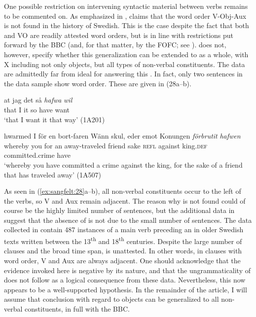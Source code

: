 \documentclass[output=paper, colorlinks, citecolor=brown]{langscibook}
\begin{document}
One possible restriction on intervening syntactic material between verbs remains to be commented on. As emphasized in , \citet[155, 159]{Petzell2011}  claims that the word order V-Obj-Aux is not found in the history of Swedish. This is the case despite the fact that both  and VO are readily attested word orders, but is in line with restrictions put forward by the BBC (and, for that matter, by the FOFC; see ). \citet{Petzell2011} does not, however, specify whether this generalization can be extended to  as a whole, with X including not only objects, but all types of non-verbal constituents. The  data are admittedly far from ideal for answering this . In fact, only two sentences in the data sample show  word order. These are given in (28a–b).


\ea\label{ex:sangfelt:28}
\ea\label{ex:sangfelt:28a}
\gll at jag det så \textit{hafwa} \textit{wil} \\ %
 that I it so have want\\
\glt ‘that I want it that way’ (1A201)

\ex\label{ex:sangfelt:28b}
\gll hwarmed I {för} {en} {bort-faren} {Wänn} {skul,} {eder} {emot} {Konungen} \textit{förbrutit} \textit{hafwen}\\
 whereby you for an away-traveled friend sake \textsc{refl} against king.\textsc{def} committed.crime have\\
\glt ‘whereby you have committed a crime against the king, for the sake of a friend that has traveled away’ (1A507)
\z 
\z 


As seen in (\ref{ex:sangfelt:28}a–b), all non-verbal constituents occur to the left of the verbs, so V and Aux remain adjacent. The reason why  is not found could of course be the highly limited number of sentences, but the additional data in \citet{Sangfelt2019} suggest that the absence of  is not due to the small number of sentences. The data collected in \citet[133]{Sangfelt2019} contain 487 instances of a main verb preceding an  in older Swedish texts written between the 13\textsuperscript{th} and 18\textsuperscript{th} centuries. Despite the large number of clauses and the broad time span,  is unattested. In other words, in clauses with  word order, V and Aux are always adjacent. One should acknowledge that the evidence invoked here is negative by its nature, and that the ungrammaticality of  does not follow as a logical consequence from these data. Nevertheless, this now appears to be a well-supported hypothesis. In the remainder of the article, I will assume that  conclusion with regard to objects can be generalized to all non-verbal constituents, in full  with the BBC.
\end{document}
